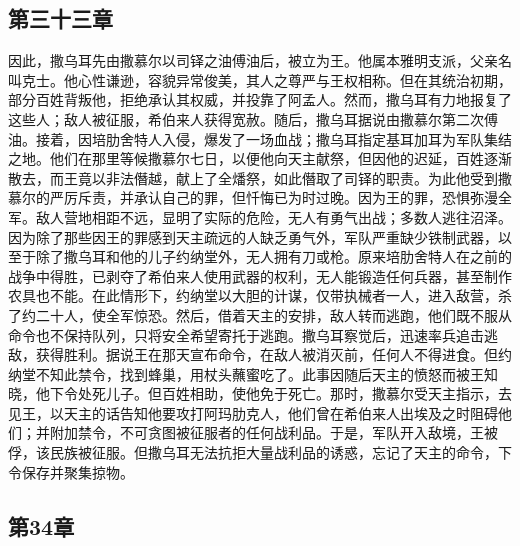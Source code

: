 
\subsection{第三十三章}

因此，撒乌耳先由撒慕尔以司铎之油傅油后，被立为王。他属本雅明支派，父亲名叫克士。他心性谦逊，容貌异常俊美，其人之尊严与王权相称。但在其统治初期，部分百姓背叛他，拒绝承认其权威，并投靠了阿孟人。然而，撒乌耳有力地报复了这些人；敌人被征服，希伯来人获得宽赦。随后，撒乌耳据说由撒慕尔第二次傅油。接着，因培肋舍特人入侵，爆发了一场血战；撒乌耳指定基耳加耳为军队集结之地。他们在那里等候撒慕尔七日，以便他向天主献祭，但因他的迟延，百姓逐渐散去，而王竟以非法僭越，献上了全燔祭，如此僭取了司铎的职责。为此他受到撒慕尔的严厉斥责，并承认自己的罪，但忏悔已为时过晚。因为王的罪，恐惧弥漫全军。敌人营地相距不远，显明了实际的危险，无人有勇气出战；多数人逃往沼泽。因为除了那些因王的罪感到天主疏远的人缺乏勇气外，军队严重缺少铁制武器，以至于除了撒乌耳和他的儿子约纳堂外，无人拥有刀或枪。原来培肋舍特人在之前的战争中得胜，已剥夺了希伯来人使用武器的权利，无人能锻造任何兵器，甚至制作农具也不能。在此情形下，约纳堂以大胆的计谋，仅带执械者一人，进入敌营，杀了约二十人，使全军惊恐。然后，借着天主的安排，敌人转而逃跑，他们既不服从命令也不保持队列，只将安全希望寄托于逃跑。撒乌耳察觉后，迅速率兵追击逃敌，获得胜利。据说王在那天宣布命令，在敌人被消灭前，任何人不得进食。但约纳堂不知此禁令，找到蜂巢，用杖头蘸蜜吃了。此事因随后天主的愤怒而被王知晓，他下令处死儿子。但百姓相助，使他免于死亡。那时，撒慕尔受天主指示，去见王，以天主的话告知他要攻打阿玛肋克人，他们曾在希伯来人出埃及之时阻碍他们；并附加禁令，不可贪图被征服者的任何战利品。于是，军队开入敌境，王被俘，该民族被征服。但撒乌耳无法抗拒大量战利品的诱惑，忘记了天主的命令，下令保存并聚集掠物。\par


\subsection{第34章}

